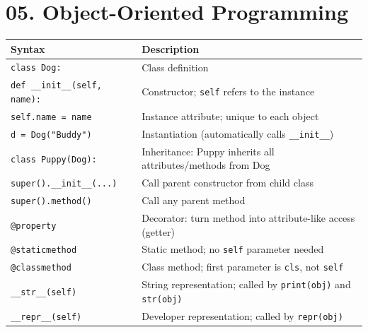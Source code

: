 \documentclass[11pt,a4paper]{report}
\let\oldtexttt\texttt
\renewcommand{\texttt}[1]{\textcolor{mainblue}{\oldtexttt{#1}}}
\begin{document}
\section*{05. Object-Oriented Programming}
\small\renewcommand{\arraystretch}{1.3}
\centering
\begin{tabularx}{\textwidth}{@{}lX@{}}
\toprule
\textbf{Syntax} & \textbf{Description} \\ \midrule
\texttt{class Dog:} & Class definition \\
\texttt{def \_\_init\_\_(self, name):} & Constructor; \texttt{self} refers to the instance \\
\texttt{self.name = name} & Instance attribute; unique to each object \\
\texttt{d = Dog("Buddy")} & Instantiation (automatically calls \texttt{\_\_init\_\_}) \\
\texttt{class Puppy(Dog):} & Inheritance: Puppy inherits all attributes/methods from Dog \\
\texttt{super().\_\_init\_\_(...)} & Call parent constructor from child class \\
\texttt{super().method()} & Call any parent method \\
\texttt{@property} & Decorator: turn method into attribute-like access (getter) \\
\texttt{@staticmethod} & Static method; no \texttt{self} parameter needed \\
\texttt{@classmethod} & Class method; first parameter is \texttt{cls}, not \texttt{self} \\
\texttt{\_\_str\_\_(self)} & String representation; called by \texttt{print(obj)} and \texttt{str(obj)} \\
\texttt{\_\_repr\_\_(self)} & Developer representation; called by \texttt{repr(obj)} \\
\bottomrule
\end{tabularx}
\normalsize

\end{document}
